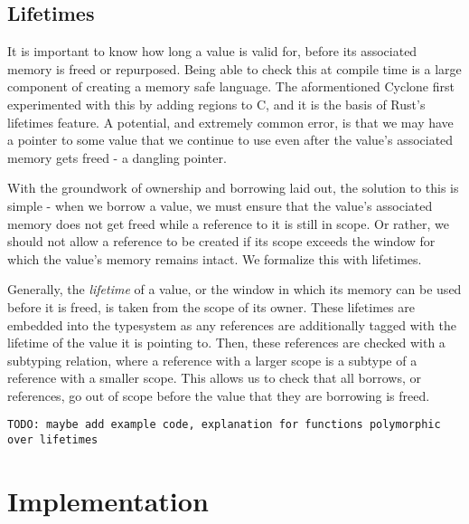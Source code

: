 \documentclass[letterpaper,11pt]{article}
\begin{document}
\subsection{Lifetimes}
It is important to know how long a value is valid for, before its associated memory
is freed or repurposed. Being able to check this at compile time is a large component
of creating a memory safe language. The aformentioned Cyclone first experimented
with this by adding regions to C, and it is the basis of Rust's lifetimes feature.
A potential, and extremely common error, is that we may have a pointer to some value
that we continue to use even after the value's associated memory gets freed - a dangling pointer.

With the groundwork of ownership and borrowing laid out, the solution to this is
simple - when we borrow a value, we must ensure that the value's associated memory
does not get freed while a reference to it is still in scope. Or rather, we should
not allow a reference to be created if its scope exceeds the window for which
the value's memory remains intact. We formalize this with lifetimes.

Generally, the \textit{lifetime} of a value, or the window in which its memory
can be used before it is freed, is taken from the scope of its owner. These
lifetimes are embedded into the typesystem as any references are additionally
tagged with the lifetime of the value it is pointing to. Then, these references
are checked with a subtyping relation, where a reference with a larger scope
is a subtype of a reference with a smaller scope. This allows us to check that
all borrows, or references, go out of scope before the value that they are borrowing
is freed.

\texttt{TODO: maybe add example code, explanation for functions polymorphic over lifetimes}

\section{Implementation}
\end{document}

